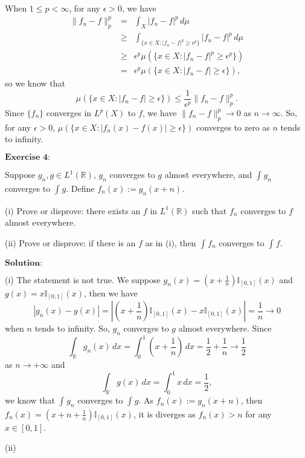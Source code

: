 \documentclass[12pt,a4paper]{ctexart}
\begin{document}
When $1 \leq p < \infty$, for any $\epsilon > 0$, we have
\begin{eqnarray*}
\|f_{n} - f\|_{p}^{p} & = & \int_{X}^{} |f_{n} - f|^{p} \, d \mu \\
& \geq & \int_{\{x \in X: |f_{n} - f|^{p} \geq \epsilon^{p}\}}^{} |f_{n} - f|^{p}  \, d \mu \\
& \geq & \epsilon^{p} \mu(\{x \in X: |f_{n} - f|^{p} \geq \epsilon^{p} \})  \\
& = & \epsilon^{p} \mu(\{x \in X: |f_{n} - f| \geq \epsilon \}),
\end{eqnarray*}
so we know that
\begin{equation*}
   \mu(\{x \in X: |f_{n} - f| \geq \epsilon \}) \leq \frac{1}{\epsilon^{p}} \| f_{n} - f \|_{p}^{p}.
\end{equation*}
Since $\{f_{n}\}$ converges in $L^{p}(X)$ to $f$, we have $\|f_{n} - f \|_{p}^{p} \to 0$ as $n \to \infty$. So, for any $\epsilon > 0$, $\mu(\{x \in X: |f_{n}(x) - f(x)| \geq \epsilon \})$ converges to zero as $n$ tends to infinity.


\vspace{8pt}

$\textbf{Exercise 4:}$

Suppose $g_{n}, g \in L^{1}(\mathbb{R})$, $g_{n}$ converges to $g$ almost everywhere, and $\int_{}^{} g_{n} $ converges to $\int_{}^{} g$. Define $f_{n}(x) := g_{n}(x + n)$.

(i) Prove or disprove: there exists an $f$ in $L^{1}(\mathbb{R})$ such that $f_{n}$ converges to $f$ almost everywhere.

(ii) Prove or disprove: if there is an $f$ as in (i), then $\int_{}^{} f_{n}$ converges to $\int_{}^{} f$.

\vspace{8pt}
$\textbf{Solution:}$

(i) The statement is not true. We suppose $g_{n}(x) = (x + \frac{1}{n}) \mathbb{I}_{[0, 1]} (x)$ and $g(x) = x \mathbb{I}_{[0, 1]} (x)$, then we have
\begin{equation*}
   |g_{n} (x) - g(x) | = | (x + \frac{1}{n}) \mathbb{I}_{[0, 1]} (x) - x \mathbb{I}_{[0, 1]} (x) | = \frac{1}{n} \to 0
\end{equation*}
when $n$ tends to infinity. So, $g_{n}$ converges to $g$ almost everywhere. Since 
\begin{equation*}
   \int_{\mathbb{R}}^{} g_{n}(x) \, d x = \int_{0}^{1} (x + \frac{1}{n}) \, d x = \frac{1}{2} + \frac{1}{n} \to \frac{1}{2} 
\end{equation*}
as $n \to + \infty$ and
\begin{equation*}
   \int_{\mathbb{R}}^{} g (x) \, d x = \int_{0}^{1} x \, d x = \frac{1}{2},
\end{equation*}
we know that $\int_{}^{} g_{n} $ converges to $\int_{}^{} g$. As $f_{n}(x) := g_{n}(x + n)$, then $f_{n} (x) = (x + n + \frac{1}{n}) \mathbb{I}_{[0, 1]} (x)$, it is diverges as $f_{n} (x) > n$ for any $x \in [0, 1]$.

(ii)
\end{document}
